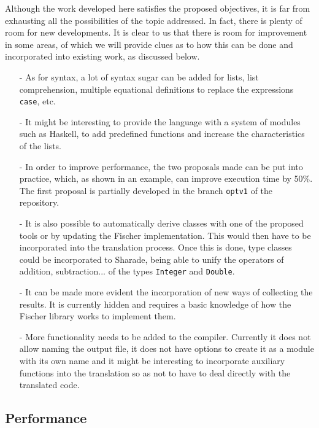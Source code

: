 \documentclass[class=article, crop=false]{standalone}
\begin{document}
Although the work developed here satisfies the proposed objectives, it is far from exhausting
all the possibilities of the topic addressed. In fact, there is plenty of room for new
developments. It is clear to us that there is room for improvement in some areas, of which we
will provide clues as to how this can be done and incorporated into existing work, as
discussed below.

\begin{itemize}
  \item[-] As for syntax, a lot of syntax sugar can be added for lists, list comprehension,
  multiple equational definitions to replace the expressions \verb`case`, etc.

  \item[-] It might be interesting to provide the language with a system of modules such as
  Haskell, to add predefined functions and increase the characteristics of the lists.

  \item[-] In order to improve performance, the two proposals made can be put into practice,
  which, as shown in an example, can improve execution time by 50\%. The first proposal is
  partially developed in the branch \verb`optv1` of the repository.

  \item[-] It is also possible to automatically derive classes with one of the proposed tools
  or by updating the Fischer implementation. This would then have to be incorporated into the
  translation process. Once this is done, type classes could be incorporated to Sharade,
  being able to unify the operators of addition, subtraction... of the types \verb`Integer`
  and \verb`Double`.

  \item[-] It can be made more evident the incorporation of new ways of collecting the
  results. It is currently hidden and requires a basic knowledge of how the Fischer library
  works to implement them.

  \item[-] More functionality needs to be added to the compiler. Currently it does not allow
  naming the output file, it does not have options to create it as a module with its own name
  and it might be interesting to incorporate auxiliary functions into the translation so as
  not to have to deal directly with the translated code.
\end{itemize}

\subsection{Performance}
\end{document}
